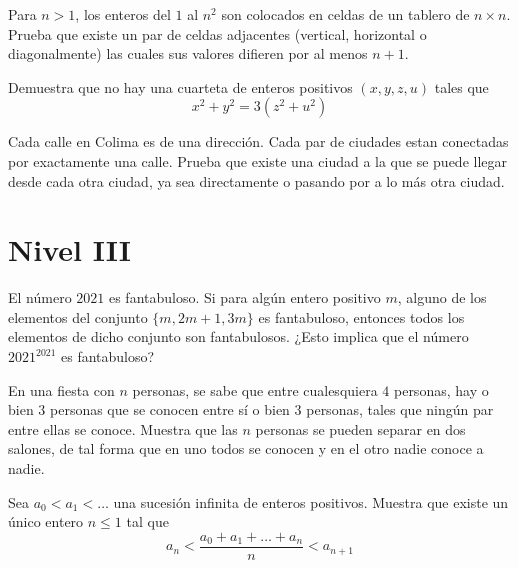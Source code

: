 \documentclass[11pt]{scrartcl}
\newcommand{\thmdifficulty}{0}
\newcommand{\problemdiff}[1]{\renewcommand{\thmdifficulty}{#1}}
\begin{document}
\problemdiff{4}
\begin{problem}
    Para $n>1$, los enteros del $1$ al $n^2$ son colocados en celdas de un tablero de $n\times n$. Prueba que existe un par de celdas adjacentes (vertical, horizontal o diagonalmente) las cuales sus valores difieren por al menos $n+1$.
\end{problem}

\problemdiff{4}
\begin{problem}
    Demuestra que no hay una cuarteta de enteros positivos $(x,y,z,u)$ tales que \[x^2+y^2=3(z^2+u^2)\]
\end{problem}



\problemdiff{4}
\begin{problem}
    Cada calle en Colima es de una dirección. Cada par de ciudades estan conectadas por exactamente una calle. Prueba que existe una ciudad a la que se puede llegar desde cada otra ciudad, ya sea directamente o pasando por a lo más otra ciudad.
\end{problem}

\section{Nivel III}
\problemdiff{5}
\begin{problem}  [EGMO 2021/1]
    
    El número $2021$ es fantabuloso. Si para algún entero positivo $m$, alguno de los elementos del conjunto $\{m, 2m + 1, 3m\}$ es fantabuloso, entonces todos los elementos de dicho conjunto
son fantabulosos. ¿Esto implica que el número $2021^{2021}$ es fantabuloso?
\end{problem}


\problemdiff{5}%
\begin{problem}
    En una fiesta con $n$ personas, se sabe que entre cualesquiera $4$ personas, hay o bien $3$
personas que se conocen entre sí o bien $3$ personas, tales que ningún par entre ellas se conoce.
Muestra que las $n$ personas se pueden separar en dos salones, de tal forma que en uno todos
se conocen y en el otro nadie conoce a nadie.
\end{problem}

\problemdiff{5}
\begin{problem}
    Sea $a_0 < a_1 <\ldots$  una sucesión infinita de enteros positivos. Muestra que existe un único entero $n \leq 1$ tal que 
    \[a_n < \frac{a_0+a_1+\ldots+a_n}{n} < a_{n+1}\]
\end{problem}
\end{document}
